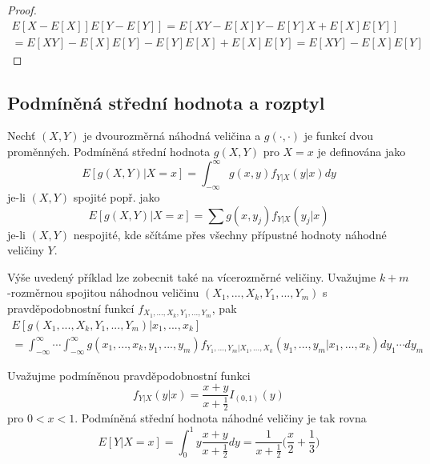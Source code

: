 \begin{proof}
\begin{gather*}
E[X - E[X]]E[Y - E[Y]] = E[XY - E[X]Y - E[Y]X + E[X]E[Y]]\\
= E[XY] - E[X]E[Y] - E[Y]E[X] + E[X]E[Y] = E[XY] - E[X]E[Y]
\end{gather*}
\end{proof}

\subsection{Podmíněná střední hodnota a rozptyl}

\begin{definition}
Nechť $(X,Y)$ je dvourozměrná náhodná veličina a $g(\cdot, \cdot)$ je funkcí dvou proměnných. Podmíněná střední hodnota $g(X,Y)$ pro $X = x$ je definována jako
\begin{equation*}
E[g(X,Y)|X = x] = \int_{-\infty}^{\infty} g(x,y)f_{Y|X}(y|x)dy
\end{equation*}
je-li $(X, Y)$ spojité popř. jako
\begin{equation*}
E[g(X, Y) | X = x] = \sum g(x, y_j)f_{Y|X}(y_j|x)
\end{equation*}
je-li $(X, Y)$ nespojité, kde sčítáme přes všechny přípustné hodnoty náhodné veličiny $Y$.
\end{definition}

Výše uvedený příklad lze zobecnit také na vícerozměrné veličiny. Uvažujme $k+m$-rozměrnou spojitou náhodnou veličinu $(X_1, ..., X_k, Y_1, ..., Y_m)$ s pravděpodobnostní funkcí $f_{X_1, ..., X_k, Y_1, ..., Y_m}$, pak
\begin{gather*}
E[g(X_1, ..., X_k, Y_1, ..., Y_m)|x_1, ..., x_k]\\
= \int_{-\infty}^{\infty} \cdots  \int_{-\infty}^{\infty} g(x_1, ..., x_k, y_1, ..., y_m)f_{Y_1, ...,Y_m|X_1,...,X_k}(y_1, ..., y_m|x_1, ..., x_k)dy_1 \cdots dy_m
\end{gather*}

\begin{example}
Uvažujme podmíněnou pravděpodobnostní funkci
\begin{equation*}
f_{Y|X}(y|x) = \frac{x + y}{x + \frac{1}{2}}I_{(0,1)}(y)
\end{equation*}
pro $0 < x <1$. Podmíněná střední hodnota náhodné veličiny je tak rovna
\begin{equation*}
E[Y|X = x] = \int_0^1 y \frac{x + y}{x + \frac{1}{2}}dy = \frac{1}{x + \frac{1}{2}}\Big(\frac{x}{2} + \frac{1}{3}\Big)
\end{equation*}
\end{example}

